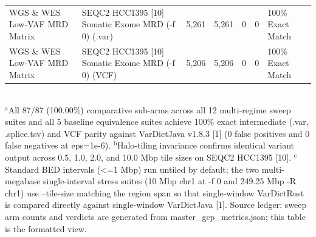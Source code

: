 \begin{table}[htbp]
{\begin{tabular}{lllllll}
WGS \& WES Low-VAF MRD Matrix & SEQC2 HCC1395 [10] Somatic Exome MRD (-f 0) (.var) & 5,261 & 5,261 & 0 & 0 & 100\% Exact Match \\
WGS \& WES Low-VAF MRD Matrix & SEQC2 HCC1395 [10] Somatic Exome MRD (-f 0) (VCF) & 5,206 & 5,206 & 0 & 0 & 100\% Exact Match \\
\hline
\end{tabular}%
}
\\[4pt]\footnotesize{$^{\text{a}}$All 87/87 (100.00\%) comparative sub-arms across all 12 multi-regime sweep suites and all 5 baseline equivalence suites achieve 100\% exact intermediate (.var, .splice.tsv) and VCF parity against VarDictJava v1.8.3 [1] (0 false positives and 0 false negatives at eps=1e-6). $^{\text{b}}$Halo-tiling invariance confirms identical variant output across 0.5, 1.0, 2.0, and 10.0 Mbp tile sizes on SEQC2 HCC1395 [10]. $^{\text{c}}$Standard BED intervals (\textless{}=1 Mbp) run untiled by default; the two multi-megabase single-interval stress suites (10 Mbp chr1 at -f 0 and 249.25 Mbp -R chr1) use --tile-size matching the region span so that single-window VarDictRust is compared directly against single-window VarDictJava [1]. Source ledger: sweep arm counts and verdicts are generated from master\_gcp\_metrics.json; this table is the formatted view.}
\end{table}
